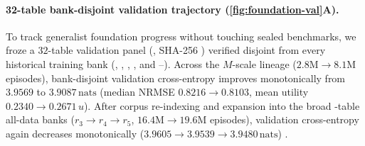 \paragraph{32-table bank-disjoint validation trajectory (\cref{fig:foundation-val}A).}
To track generalist foundation progress without touching sealed benchmarks, we froze a $32$-table validation panel (, SHA-256 ) verified disjoint from every historical training bank (, , , , and --). Across the \regfair{} $M$-scale lineage ($2.8\mathrm{M} \to 8.1\mathrm{M}$ episodes), bank-disjoint validation cross-entropy improves monotonically from $3.9569$ to $3.9087\,\text{nats}$ (median NRMSE $0.8216 \to 0.8103$, mean utility $0.2340 \to 0.2671\,u$). After corpus re-indexing and expansion into the broad \BHRFiveTables{}-table all-data banks ($r_3 \to r_4 \to r_5$, $16.4\mathrm{M} \to 19.6\mathrm{M}$ episodes), validation cross-entropy again decreases monotonically ($3.9605 \to 3.9539 \to 3.9480\,\text{nats}$) \est{}.
